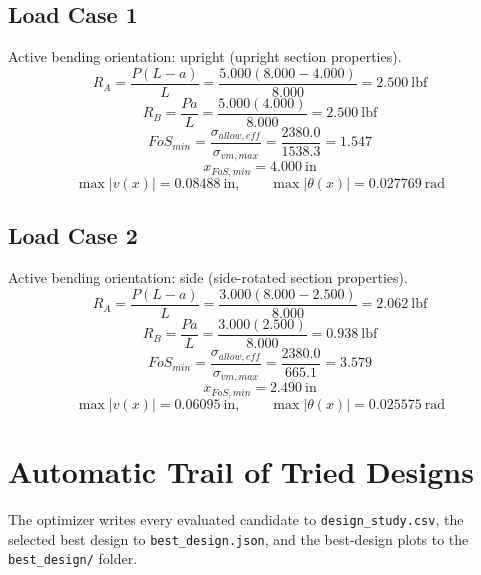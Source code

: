 \documentclass[11pt]{article}
\begin{document}
\subsection*{Load Case 1}
Active bending orientation: upright (upright section properties).
\[R_A = \frac{P(L-a)}{L} = \frac{5.000(8.000-4.000)}{8.000} = 2.500\ \mathrm{lbf}\]
\[R_B = \frac{Pa}{L} = \frac{5.000(4.000)}{8.000} = 2.500\ \mathrm{lbf}\]
\[FoS_{min} = \frac{\sigma_{allow,eff}}{\sigma_{vm,max}} = \frac{2380.0}{1538.3} = 1.547\]
\[x_{FoS,min} = 4.000\ \mathrm{in}\]
\[\max |v(x)| = 0.08488\ \mathrm{in}, \qquad \max |\theta(x)| = 0.027769\ \mathrm{rad}\]
\subsection*{Load Case 2}
Active bending orientation: side (side-rotated section properties).
\[R_A = \frac{P(L-a)}{L} = \frac{3.000(8.000-2.500)}{8.000} = 2.062\ \mathrm{lbf}\]
\[R_B = \frac{Pa}{L} = \frac{3.000(2.500)}{8.000} = 0.938\ \mathrm{lbf}\]
\[FoS_{min} = \frac{\sigma_{allow,eff}}{\sigma_{vm,max}} = \frac{2380.0}{665.1} = 3.579\]
\[x_{FoS,min} = 2.490\ \mathrm{in}\]
\[\max |v(x)| = 0.06095\ \mathrm{in}, \qquad \max |\theta(x)| = 0.025575\ \mathrm{rad}\]

\section*{Automatic Trail of Tried Designs}
The optimizer writes every evaluated candidate to \texttt{design\_study.csv}, the selected best design to \texttt{best\_design.json}, and the best-design plots to the \texttt{best\_design/} folder.
\end{document}
